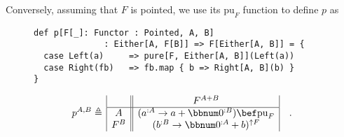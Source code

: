 Conversely, assuming that $F$ is pointed, we use its $\text{pu}_{F}$
function to define $p$ as

\begin{wrapfigure}{l}{0.58\columnwidth}%
\vspace{-0.2\baselineskip}
\begin{lstlisting}
def p[F[_]: Functor : Pointed, A, B]
              : Either[A, F[B]] => F[Either[A, B]] = {
  case Left(a)     => pure[F, Either[A, B]](Left(a))
  case Right(fb)   => fb.map { b => Right[A, B](b) }
}
\end{lstlisting}

\vspace{-4\baselineskip}
\end{wrapfigure}%

\noindent \vspace{-0.75\baselineskip}
\[
p^{A,B}\triangleq\,\begin{array}{|c||c|}
 & F^{A+B}\\
\hline A & (a^{:A}\rightarrow a+\bbnum 0^{:B})\bef\text{pu}_{F}\\
F^{B} & (b^{:B}\rightarrow\bbnum 0^{:A}+b)^{\uparrow F}
\end{array}\quad.
\]

